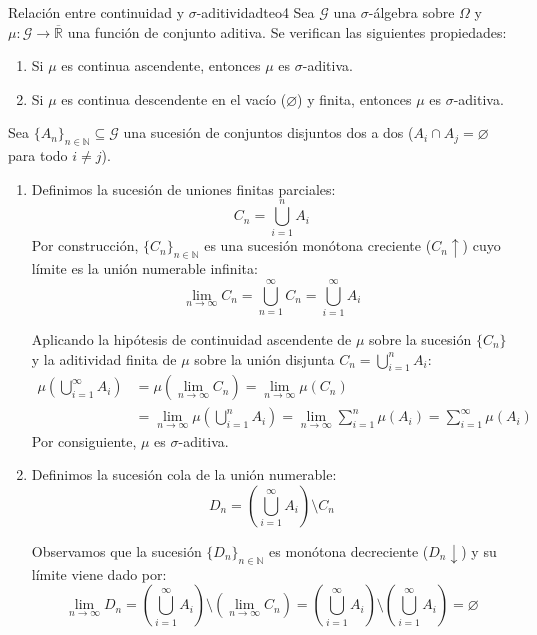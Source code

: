 \begin{teorema}{Relación entre continuidad y \texorpdfstring{$\sigma$}{sigma}-aditividad}{teo4}
Sea $\mathcal{G}$ una $\sigma$-álgebra sobre $\Omega$ y $\mu : \mathcal{G} \to \overline{\mathbb{R}}$ una función de conjunto aditiva. Se verifican las siguientes propiedades:
\begin{enumerate}[label=\alph*)]
    \item Si $\mu$ es continua ascendente, entonces $\mu$ es $\sigma$-aditiva.
    \item Si $\mu$ es continua descendente en el vacío ($\varnothing$) y finita, entonces $\mu$ es $\sigma$-aditiva.
\end{enumerate}
\end{teorema}

\begin{demostracion}
Sea $\{A_n\}_{n \in \mathbb{N}} \subseteq \mathcal{G}$ una sucesión de conjuntos disjuntos dos a dos ($A_i \cap A_j = \varnothing$ para todo $i \neq j$).

\begin{enumerate}[label=\alph*)]
    \item Definimos la sucesión de uniones finitas parciales:
    \[
        C_n = \bigcup_{i=1}^n A_i
    \]
    Por construcción, $\{C_n\}_{n \in \mathbb{N}}$ es una sucesión monótona creciente ($C_n \uparrow$) cuyo límite es la unión numerable infinita:
    \[
        \lim_{n \to \infty} C_n = \bigcup_{n=1}^\infty C_n = \bigcup_{i=1}^\infty A_i
    \]
    
    Aplicando la hipótesis de continuidad ascendente de $\mu$ sobre la sucesión $\{C_n\}$ y la aditividad finita de $\mu$ sobre la unión disjunta $C_n = \bigcup_{i=1}^n A_i$:
    \begin{align*}
        \mu\left( \bigcup_{i=1}^\infty A_i \right) &= \mu\left( \lim_{n \to \infty} C_n \right) = \lim_{n \to \infty} \mu(C_n) \\
        &= \lim_{n \to \infty} \mu\left( \bigcup_{i=1}^n A_i \right) = \lim_{n \to \infty} \sum_{i=1}^n \mu(A_i) = \sum_{i=1}^\infty \mu(A_i)
    \end{align*}
    Por consiguiente, $\mu$ es $\sigma$-aditiva.

    \item Definimos la sucesión cola de la unión numerable:
     \[
     D_n = \displaystyle\left( \bigcup_{i=1}^\infty A_i \right) \setminus C_n
     \]
    
    Observamos que la sucesión $\{D_n\}_{n \in \mathbb{N}}$ es monótona decreciente ($D_n \downarrow$) y su límite viene dado por:
    \[
        \lim_{n \to \infty} D_n = \left( \bigcup_{i=1}^\infty A_i \right) \setminus \left( \lim_{n \to \infty} C_n \right) = \left( \bigcup_{i=1}^\infty A_i \right) \setminus \left( \bigcup_{i=1}^\infty A_i \right) = \varnothing
    \]
    

\end{enumerate}
\end{demostracion}
